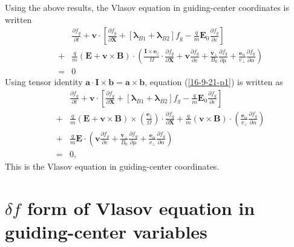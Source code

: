 \documentclass{article}
\newcommand{\tmmathbf}[1]{\ensuremath{\boldsymbol{#1}}}
\begin{document}
Using the above results, the Vlasov equation in guiding-center coordinates is
written
\begin{eqnarray}
  &  & \frac{\partial f_g}{\partial t} +\mathbf{v} \cdot \left[
  \frac{\partial f_g}{\partial \mathbf{X}} + [\tmmathbf{\lambda}_{B 1}
  +\tmmathbf{\lambda}_{B 2}] f_g - \frac{q}{m} \mathbf{E}_0 \frac{\partial
  f_g}{\partial \varepsilon} \right] \nonumber\\
  & + & \frac{q}{m} (\mathbf{E}+\mathbf{v} \times \mathbf{B}) \cdot \left(
  \frac{\mathbf{I} \times \tmmathbf{e}_{\parallel}}{\Omega} \cdot
  \frac{\partial f_g}{\partial \mathbf{X}} +\mathbf{v} \frac{\partial
  f_g}{\partial \varepsilon} + \frac{\mathbf{v}_{\perp}}{B_0}  \frac{\partial
  f_g}{\partial \mu} + \frac{\tmmathbf{e}_{\alpha}}{v_{\perp}}  \frac{\partial
  f_g}{\partial \alpha} \right) \nonumber\\
  & = & 0  \label{16-9-21-p1}
\end{eqnarray}
Using tensor identity $\mathbf{a} \cdot \mathbf{I} \times
\mathbf{b}=\mathbf{a} \times \mathbf{b}$, equation (\ref{16-9-21-p1}) is
written as
\begin{eqnarray}
  &  & \frac{\partial f_g}{\partial t} +\mathbf{v} \cdot \left[
  \frac{\partial f_g}{\partial \mathbf{X}} + [\tmmathbf{\lambda}_{B 1}
  +\tmmathbf{\lambda}_{B 2}] f_g - \frac{q}{m} \mathbf{E}_0 \frac{\partial
  f_g}{\partial \varepsilon} \right] \nonumber\\
  & + & \frac{q}{m} (\mathbf{E}+\mathbf{v} \times \mathbf{B}) \times \left(
  \frac{\tmmathbf{e}_{\parallel}}{\Omega}  \right) \cdot \frac{\partial
  f_g}{\partial \mathbf{X}} + \frac{q}{m} (\mathbf{v} \times \mathbf{B}) \cdot
  \left( \frac{\tmmathbf{e}_{\alpha}}{v_{\perp}}  \frac{\partial f_g}{\partial
  \alpha} \right) \nonumber\\
  & + & \frac{q}{m} \mathbf{E} \cdot \left( \mathbf{v} \frac{\partial
  f_g}{\partial \varepsilon} + \frac{\mathbf{v}_{\perp}}{B_0}  \frac{\partial
  f_g}{\partial \mu} + \frac{\tmmathbf{e}_{\alpha}}{v_{\perp}}  \frac{\partial
  f_g}{\partial \alpha} \right) \nonumber\\
  & = & 0,  \label{16-10-2-p1}
\end{eqnarray}
This is the Vlasov equation in guiding-center coordinates.

\section{$\delta f$ form of Vlasov equation in guiding-center variables}
\end{document}

